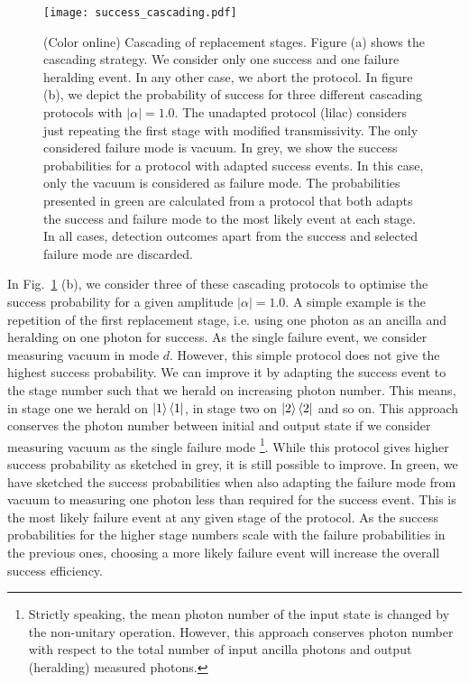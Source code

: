 \documentclass[aps,prl,twocolumn, superscriptaddress]{revtex4-1}
\begin{document}
%
\begin{figure}
\texttt{[image: success\_cascading.pdf]}
\caption{(Color online) Cascading of replacement stages. Figure (a) shows the cascading strategy. We consider only one success and one failure heralding event. In any other case, we abort the protocol. In figure (b), we depict the probability of success for three different cascading protocols with $|\alpha|=1.0$. The unadapted protocol (lilac) considers just repeating the first stage with modified transmissivity. The only considered failure mode is vacuum. In grey, we show the success probabilities for a protocol with adapted success events. In this case, only the vacuum is considered as failure mode. The probabilities presented in green are calculated from a protocol that both adapts the success and failure mode to the most likely event at each stage. In all cases, detection outcomes apart from the success and selected failure mode are discarded.}
\label{fig:cascading}
\end{figure}
%
In Fig.~\ref{fig:cascading} (b), we consider three of these cascading protocols to optimise the success probability for a given amplitude $|\alpha|=1.0$. A simple example is the repetition of the first replacement stage, {i.e.} using one photon as an ancilla and heralding on one photon for success. As the single failure event, we consider measuring vacuum in mode $d$. However, this simple protocol does not give the highest success probability. We can improve it by adapting the success event to the stage number such that we herald on increasing photon number. This means, in stage one we herald on $\ket{1}\bra{1}$, in stage two on $\ket{2}\bra{2}$ and so on. This approach conserves the photon number between initial and output state if we consider measuring vacuum as the single failure mode \footnote{Strictly speaking, the mean photon number of the input state is changed by the non-unitary operation. However, this approach conserves photon number with respect to the total number of input ancilla photons and output (heralding) measured photons.}. While this protocol gives higher success probability as sketched in grey, it is still possible to improve. In green, we have sketched the success probabilities when also adapting the failure mode from vacuum to measuring one photon less than required for the success event. This is the most likely failure event at any given stage of the protocol. As the success probabilities for the higher stage numbers scale with the failure probabilities in the previous ones, choosing a more likely failure event will increase the overall success efficiency.
\end{document}

